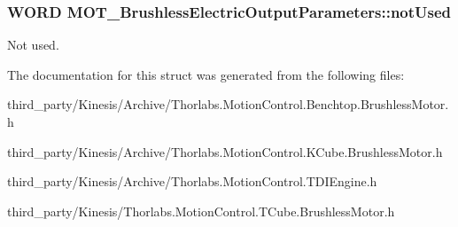 \subsubsection[{\texorpdfstring{not\+Used}{notUsed}}]{\setlength{\rightskip}{0pt plus 5cm}W\+O\+RD M\+O\+T\+\_\+\+Brushless\+Electric\+Output\+Parameters\+::not\+Used}\hypertarget{struct_m_o_t___brushless_electric_output_parameters_a6d63e90879143baac1eaf70d6349b4d5}{}\label{struct_m_o_t___brushless_electric_output_parameters_a6d63e90879143baac1eaf70d6349b4d5}


Not used. 



The documentation for this struct was generated from the following files\+:\begin{DoxyCompactItemize}
\item 
third\+\_\+party/\+Kinesis/\+Archive/Thorlabs.\+Motion\+Control.\+Benchtop.\+Brushless\+Motor.\+h\item 
third\+\_\+party/\+Kinesis/\+Archive/Thorlabs.\+Motion\+Control.\+K\+Cube.\+Brushless\+Motor.\+h\item 
third\+\_\+party/\+Kinesis/\+Archive/Thorlabs.\+Motion\+Control.\+T\+D\+I\+Engine.\+h\item 
third\+\_\+party/\+Kinesis/Thorlabs.\+Motion\+Control.\+T\+Cube.\+Brushless\+Motor.\+h\end{DoxyCompactItemize}
